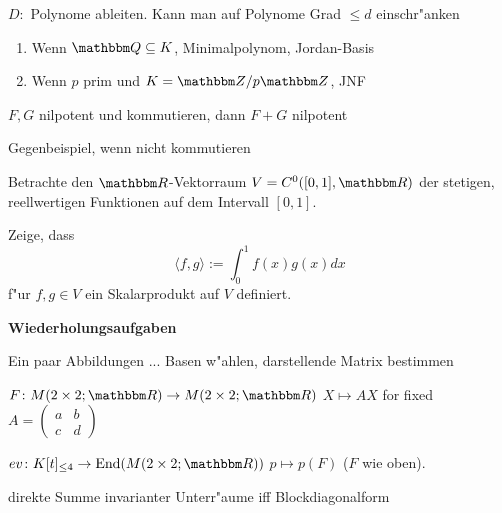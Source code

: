 \documentclass[a4,11pt]{article}
\DeclareMathOperator{\End}{End}
\begin{document}
\vspace*{-17mm}
{
\kopf
}


\begin{aufgabe}[4 Punkte]

  $D \colon$ Polynome ableiten. Kann man auf Polynome Grad $\le d$ einschr"anken
  
\begin{enumerate}
\item Wenn $\Q \subseteq K$, Minimalpolynom, Jordan-Basis
\item Wenn $p$ prim und $K = \Z/p\Z$, JNF
\end{enumerate}

\end{aufgabe}

\begin{aufgabe}[4 Punkte]
  $F,G$ nilpotent und kommutieren, dann $F+G$ nilpotent

  Gegenbeispiel, wenn nicht kommutieren
\end{aufgabe}


\begin{aufgabe}[4 Punkte]
Betrachte den $\R$-Vektorraum $V=C^0([0,1],\R)$ der stetigen,
reellwertigen Funktionen auf dem Intervall $[0,1]$.

Zeige, dass
$$
\langle f,g \rangle := \int_0^1 f(x)g(x) dx
$$
f"ur $f,g \in V$ ein Skalarprodukt auf $V$ definiert.

\end{aufgabe}

\bigskip
{\Large \bfseries Wiederholungsaufgaben}
\bigskip

\begin{aufgabe}
  Ein paar Abbildungen ... Basen w"ahlen, darstellende Matrix bestimmen

  $F \colon M(2 \times 2; \R) \to M(2 \times 2; \R)$ $X \mapsto AX$
  for fixed $A =
  \left( \begin{smallmatrix}a&b\\c&d\end{smallmatrix}\right)$  
  
  $ev \colon K[t]_{\le 4} \to \End(M(2 \times 2; \R))$ $p \mapsto
  p(F)$ ($F$ wie oben).
\end{aufgabe}

\begin{aufgabe}
  direkte Summe invarianter Unterr"aume iff Blockdiagonalform
\end{aufgabe}
\end{document}
